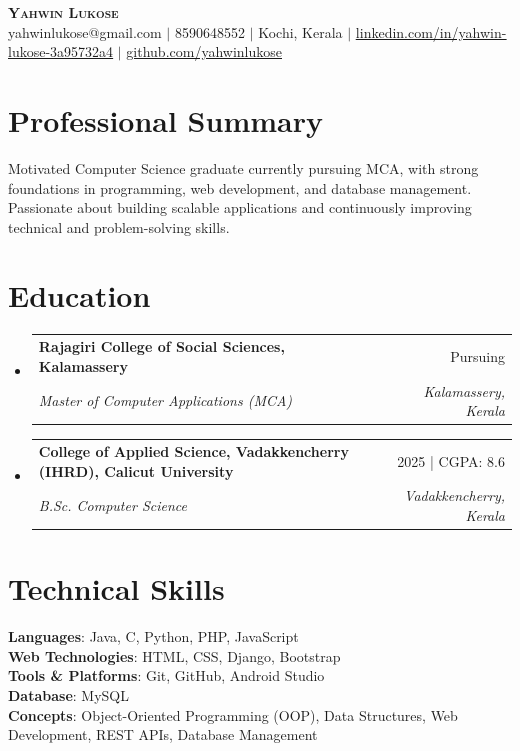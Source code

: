 \documentclass[a4paper,11pt]{article}
\makeatletter
\newcommand{\resumeSubheading}[4]{
  \vspace{-2pt}\item
    \begin{tabular*}{0.97\textwidth}[t]{l@{\extracolsep{\fill}}r}
      \textbf{#1} & #2 \\
      \textit{\small#3} & \textit{\small #4} \\
    \end{tabular*}\vspace{-7pt}
}
\newcommand{\resumeSubHeadingListStart}{\begin{itemize}[leftmargin=0.15in, label={}]}
\newcommand{\resumeSubHeadingListEnd}{\end{itemize}}
\makeatother
\begin{document}
\begin{center}
    \textbf{\Huge \scshape Yahwin Lukose} \\ \vspace{5pt}
    \small yahwinlukose@gmail.com $|$ 8590648552 $|$ Kochi, Kerala $|$
    \href{https://www.linkedin.com/in/yahwin-lukose-3a95732a4}{\underline{linkedin.com/in/yahwin-lukose-3a95732a4}} $|$
    \href{https://github.com/yahwinlukose}{\underline{github.com/yahwinlukose}}
\end{center}

\section{Professional Summary}
\vspace{2pt}
\small{Motivated Computer Science graduate currently pursuing MCA, with strong foundations in programming, web development, and database management. Passionate about building scalable applications and continuously improving technical and problem-solving skills.}

\section{Education}
  \resumeSubHeadingListStart
    \resumeSubheading
      {Rajagiri College of Social Sciences, Kalamassery}{Pursuing}
      {Master of Computer Applications (MCA)}{Kalamassery, Kerala}
    \resumeSubheading
      {College of Applied Science, Vadakkencherry (IHRD), Calicut University}{2025 | CGPA: 8.6}
      {B.Sc. Computer Science}{Vadakkencherry, Kerala}
  \resumeSubHeadingListEnd

\section{Technical Skills}
 \begin{itemize}[leftmargin=0.15in, label={}]
   \small{\item{
    \textbf{Languages}{: Java, C, Python, PHP, JavaScript} \\
    \textbf{Web Technologies}{: HTML, CSS, Django, Bootstrap} \\
    \textbf{Tools \& Platforms}{: Git, GitHub, Android Studio} \\
    \textbf{Database}{: MySQL} \\
    \textbf{Concepts}{: Object-Oriented Programming (OOP), Data Structures, Web Development, REST APIs, Database Management} \\
   }}
 \end{itemize}
\end{document}
